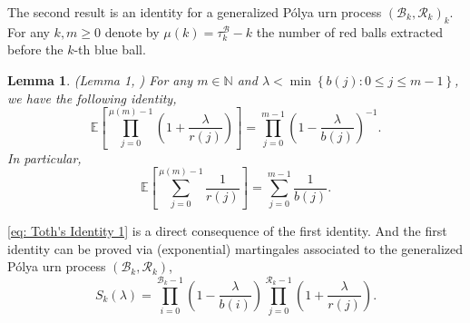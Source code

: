 \documentclass[twoside,12pt, a4paper]{article}
\newtheorem{lemma}{Lemma}[section]
\numberwithin{equation}{section}
\theoremstyle{remark}
\begin{document}
	
	
	The second result is an identity for a generalized P\'{o}lya urn process $(\mathcal{B}_{k},\mathcal{R}_{k})_k$. For any $k,m\geq 0$ denote by $\mu(k)= \tau^{\mathcal{B}}_k - k$ the number of red balls extracted before the $k$-th blue ball. 
	\begin{lemma}(Lemma 1, \cite{T96}) \label{lm: Toth's Identity}
		For any $m\in \mathbb{N}$ and $\lambda < \min\left\{ b(j): 0\leq j\leq m-1 \right\}$, we have the following identity,
		$$  \mathbb{E}\left[  \prod_{j=0}^{ \mu(m)-1 } \left(1+ \frac{\lambda}{r(j)}   \right) \right] =   \prod_{j=0}^{ m-1 } \left(1- \frac{\lambda}{b(j)}   \right)^{-1}.   $$ 
		In particular, 
		\begin{equation}\label{eq: Toth's Identity 1}
			\mathbb{E}\left[  \sum_{j=0}^{ \mu(m)-1 } \frac{1}{r(j)}   \right] =   \sum_{j=0}^{ m-1 } \frac{1}{b(j)}.
		\end{equation}	
	\end{lemma}
	\eqref{eq: Toth's Identity 1} is a direct consequence of the first identity. And the first identity can be proved via (exponential) martingales associated to the generalized P\'{o}lya urn process $(\mathcal{B}_{k},\mathcal{R}_{k})$, 
	\[
	S_k(\lambda) = \prod_{i=0}^{ \mathcal{B}_{k}-1 } \left(1-\frac{\lambda}{b(i)}\right) \prod_{j=0}^{\mathcal{R}_{k}-1 } \left(1+\frac{\lambda}{r(j)}\right)
.\]
	
\end{document}
